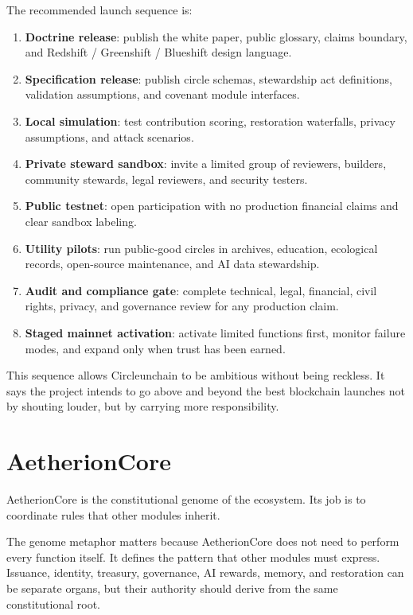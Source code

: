 \documentclass[12pt]{article}
\begin{document}
The recommended launch sequence is:

\begin{enumerate}
  \item \textbf{Doctrine release}: publish the white paper, public glossary, claims boundary, and Redshift / Greenshift / Blueshift design language.
  \item \textbf{Specification release}: publish circle schemas, stewardship act definitions, validation assumptions, and covenant module interfaces.
  \item \textbf{Local simulation}: test contribution scoring, restoration waterfalls, privacy assumptions, and attack scenarios.
  \item \textbf{Private steward sandbox}: invite a limited group of reviewers, builders, community stewards, legal reviewers, and security testers.
  \item \textbf{Public testnet}: open participation with no production financial claims and clear sandbox labeling.
  \item \textbf{Utility pilots}: run public-good circles in archives, education, ecological records, open-source maintenance, and AI data stewardship.
  \item \textbf{Audit and compliance gate}: complete technical, legal, financial, civil rights, privacy, and governance review for any production claim.
  \item \textbf{Staged mainnet activation}: activate limited functions first, monitor failure modes, and expand only when trust has been earned.
\end{enumerate}

This sequence allows Circleunchain to be ambitious without being reckless. It says the project intends to go above and beyond the best blockchain launches not by shouting louder, but by carrying more responsibility.

\section{AetherionCore}

AetherionCore is the constitutional genome of the ecosystem. Its job is to coordinate rules that other modules inherit.

The genome metaphor matters because AetherionCore does not need to perform every function itself. It defines the pattern that other modules must express. Issuance, identity, treasury, governance, AI rewards, memory, and restoration can be separate organs, but their authority should derive from the same constitutional root.
\end{document}
